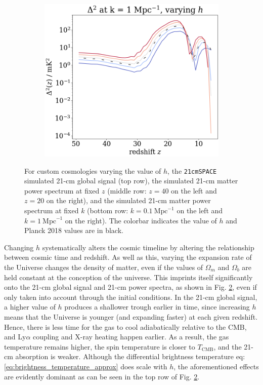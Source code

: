 \documentclass[floats,floatfix,showpacs,amssymb,prd,superscriptaddress,nofootinbib]{revtex4-2} %
\newcommand{\code}{\texttt}
\begin{document}
\begin{figure}[H]
\begin{subfigure}[b]{0.45\textwidth}
     \end{subfigure}
     \hfill
     \begin{subfigure}[b]{0.45\textwidth}
         \centering
         \includegraphics[width=\textwidth]{images/simulation_results/power_spectrum_fixed_k_1_h.png}
         \label{fig:power_spectrum_fixed_k_1_h}
     \end{subfigure}
        \caption{For custom cosmologies varying the value of $h$, the \code{21cmSPACE} simulated 21-cm global signal (top row), the simulated 21-cm matter power spectrum at fixed $z$ (middle row: $z = 40$ on the left and $z = 20$ on the right), and the simulated 21-cm matter power spectrum at fixed $k$ (bottom row: $k = 0.1 ~\text{Mpc}^{-1}$ on the left and $k = 1 ~\text{Mpc}^{-1}$ on the right). The colorbar indicates the value of $h$ and Planck 2018 values are in black.}
        \label{fig:simulation_results_h}
\end{figure}

Changing $h$ systematically alters the cosmic timeline by altering the relationship between cosmic time and redshift. As well as this, varying the expansion rate of the Universe changes the density of matter, even if the values of $\Omega_m$ and $\Omega_b$ are held constant at the conception of the universe. This imprints itself significantly onto the 21-cm global signal and 21-cm power spectra, as shown in Fig. \ref{fig:simulation_results_h}, even if only taken into account through the initial conditions. In the 21-cm global signal, a higher value of $h$ produces a shallower trough earlier in time, since increasing $h$ means that the Universe is younger (and expanding faster) at each given redshift. Hence, there is less time for the gas to cool adiabatically relative to the CMB, and Ly$\alpha$ coupling and X-ray heating happen earlier. As a result, the gas temperature remains higher, the spin temperature is closer to $T_{\text{CMB}}$, and the 21-cm absorption is weaker. Although the differential brightness temperature eq: \ref{eq:brightness_temperature_approx} does scale with $h$, the aforementioned effects are evidently dominant as can be seen in the top row of Fig. \ref{fig:simulation_results_h}. 
\end{document}

